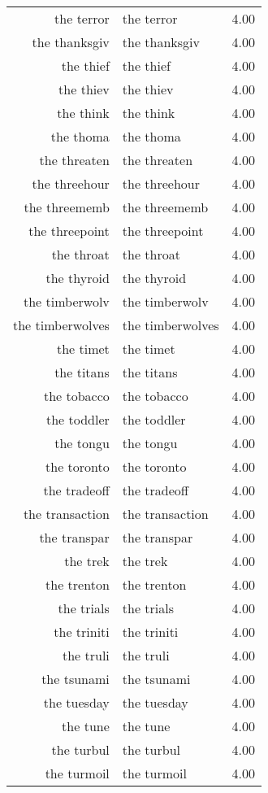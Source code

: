 \begin{table}[ht]
\begin{tabular}{rlr}
  the terror & the terror & 4.00 \\ 
  the thanksgiv & the thanksgiv & 4.00 \\ 
  the thief & the thief & 4.00 \\ 
  the thiev & the thiev & 4.00 \\ 
  the think & the think & 4.00 \\ 
  the thoma & the thoma & 4.00 \\ 
  the threaten & the threaten & 4.00 \\ 
  the threehour & the threehour & 4.00 \\ 
  the threememb & the threememb & 4.00 \\ 
  the threepoint & the threepoint & 4.00 \\ 
  the throat & the throat & 4.00 \\ 
  the thyroid & the thyroid & 4.00 \\ 
  the timberwolv & the timberwolv & 4.00 \\ 
  the timberwolves & the timberwolves & 4.00 \\ 
  the timet & the timet & 4.00 \\ 
  the titans & the titans & 4.00 \\ 
  the tobacco & the tobacco & 4.00 \\ 
  the toddler & the toddler & 4.00 \\ 
  the tongu & the tongu & 4.00 \\ 
  the toronto & the toronto & 4.00 \\ 
  the tradeoff & the tradeoff & 4.00 \\ 
  the transaction & the transaction & 4.00 \\ 
  the transpar & the transpar & 4.00 \\ 
  the trek & the trek & 4.00 \\ 
  the trenton & the trenton & 4.00 \\ 
  the trials & the trials & 4.00 \\ 
  the triniti & the triniti & 4.00 \\ 
  the truli & the truli & 4.00 \\ 
  the tsunami & the tsunami & 4.00 \\ 
  the tuesday & the tuesday & 4.00 \\ 
  the tune & the tune & 4.00 \\ 
  the turbul & the turbul & 4.00 \\ 
  the turmoil & the turmoil & 4.00 \\ 

\end{tabular}
\end{table}
